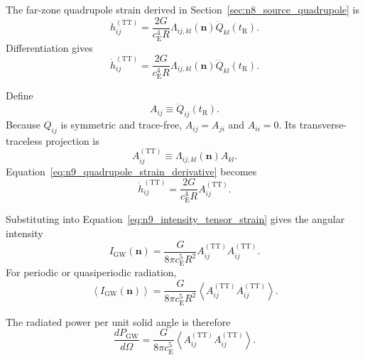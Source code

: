 The far-zone quadrupole strain derived in Section~\ref{sec:n8_source_quadrupole} is
\begin{equation}
    h_{ij}^{(\mathrm{TT})} = \frac{ 2G }{ c_{\mathrm{E}}^{4}R } \Lambda_{ij,kl}(\mathbf{n}) \ddot{Q}_{kl} \left( t_{\mathrm{R}} \right).
    \label{eq:n9_quadrupole_strain}
\end{equation}
Differentiation gives
\begin{equation}
    \dot{h}_{ij}^{(\mathrm{TT})} = \frac{ 2G }{ c_{\mathrm{E}}^{4}R } \Lambda_{ij,kl}(\mathbf{n}) \dddot{Q}_{kl} \left( t_{\mathrm{R}} \right).
    \label{eq:n9_quadrupole_strain_derivative}
\end{equation}

Define
\begin{equation}
    A_{ij} \equiv \dddot{Q}_{ij} \left( t_{\mathrm{R}} \right).
    \label{eq:n9_A_definition}
\end{equation}
Because $Q_{ij}$ is symmetric and trace-free, $A_{ij} = A_{ji}$ and $A_{ii} = 0$. Its transverse-traceless projection is
\begin{equation}
    A_{ij}^{(\mathrm{TT})} \equiv \Lambda_{ij,kl}(\mathbf{n}) A_{kl}.
    \label{eq:n9_A_TT_definition}
\end{equation}
Equation~\eqref{eq:n9_quadrupole_strain_derivative} becomes
\begin{equation}
    \dot{h}_{ij}^{(\mathrm{TT})} = \frac{ 2G }{ c_{\mathrm{E}}^{4}R } A_{ij}^{(\mathrm{TT})}.
\end{equation}

Substituting into Equation~\eqref{eq:n9_intensity_tensor_strain} gives the angular intensity
\begin{equation}
    I_{\mathrm{GW}}(\mathbf{n}) = \frac{ G }{ 8\pi c_{\mathrm{E}}^{5}R^{2} } A_{ij}^{(\mathrm{TT})} A_{ij}^{(\mathrm{TT})}.
    \label{eq:n9_angular_intensity}
\end{equation}
For periodic or quasiperiodic radiation,
\begin{equation}
    \left\langle I_{\mathrm{GW}}(\mathbf{n}) \right\rangle = \frac{ G }{ 8\pi c_{\mathrm{E}}^{5}R^{2} } \left\langle A_{ij}^{(\mathrm{TT})} A_{ij}^{(\mathrm{TT})} \right\rangle.
    \label{eq:n9_average_angular_intensity}
\end{equation}

The radiated power per unit solid angle is therefore
\begin{equation}
    \frac{dP_{\mathrm{GW}}}{d\Omega} = \frac{ G }{ 8\pi c_{\mathrm{E}}^{5} } \left\langle A_{ij}^{(\mathrm{TT})} A_{ij}^{(\mathrm{TT})} \right\rangle.
    \label{eq:n9_power_per_solid_angle}
\end{equation}

